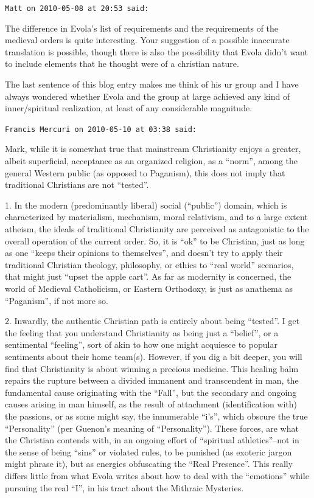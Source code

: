 \begin{footnotesize}
\begin{sffamily}
\hfill

\texttt{Matt on 2010-05-08 at 20:53 said:}

The difference in Evola's list of requirements and the requirements of the medieval orders is quite interesting. Your suggestion of a possible inaccurate translation is possible, though there is also the possibility that Evola didn't want to include elements that he thought were of a christian nature.

The last sentence of this blog entry makes me think of his ur group and I have always wondered whether Evola and the group at large achieved any kind of inner/spiritual realization, at least of any considerable magnitude.

\hfill

\texttt{Francis Mercuri on 2010-05-10 at 03:38 said:}

Mark, while it is somewhat true that mainstream Christianity enjoys a greater, albeit superficial, acceptance as an organized religion, as a ``norm'', among the general Western public (as opposed to Paganism), this does not imply that traditional Christians are not ``tested''.

1. In the modern (predominantly liberal) social (``public'') domain, which is characterized by materialism, mechanism, moral relativism, and to a large extent atheism, the ideals of traditional Christianity are perceived as antagonistic to the overall operation of the current order. So, it is ``ok'' to be Christian, just as long as one ``keeps their opinions to themselves'', and doesn't try to apply their traditional Christian theology, philosophy, or ethics to ``real world'' scenarios, that might just ``upset the apple cart''. As far as modernity is concerned, the world of Medieval Catholicism, or Eastern Orthodoxy, is just as anathema as ``Paganism'', if not more so.

2. Inwardly, the authentic Christian path is entirely about being ``tested''. I get the feeling that you understand Christianity as being just a ``belief'', or a sentimental ``feeling'', sort of akin to how one might acquiesce to popular sentiments about their home team(s). However, if you dig a bit deeper, you will find that Christianity is about winning a precious medicine. This healing balm repairs the rupture between a divided immanent and transcendent in man, the fundamental cause originating with the ``Fall'', but the secondary and ongoing causes arising in man himself, as the result of attachment (identification with) the passions, or as some might say, the innumerable ``i's'', which obscure the true ``Personality'' (per Guenon's meaning of ``Personality''). These forces, are what the Christian contends with, in an ongoing effort of ``spiritual athletics''--not in the sense of being ``sins'' or violated rules, to be punished (as exoteric jargon might phrase it), but as energies obfuscating the ``Real Presence''. This really differs little from what Evola writes about how to deal with the ``emotions'' while pursuing the real ``I'', in his tract about the Mithraic Mysteries.


\end{sffamily}
\end{footnotesize}
